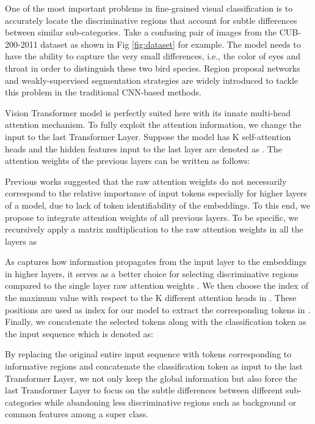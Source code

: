 \documentclass[10pt,twocolumn,letterpaper]{article}
\begin{document}
One of the most important problems in fine-grained visual classification is to accurately locate the discriminative regions that account for subtle differences between similar sub-categories. Take a confusing pair of images from the CUB-200-2011 dataset as shown in Fig \ref{fig:dataset} for example. The model needs to have the ability to capture the very small differences, i.e., the color of eyes and throat in order to distinguish these two bird species. Region proposal networks and weakly-supervised segmentation strategies are widely introduced to tackle this problem in the traditional CNN-based methods.

Vision Transformer model is perfectly suited here with its innate multi-head attention mechanism. To fully exploit the attention information, we change the input to the last Transformer Layer. Suppose the model has K self-attention heads and the hidden features input to the last layer are denoted as . The attention weights of the previous layers can be written as follows:

Previous works \cite{serrano2019attention, abnar2020quantifying} suggested that the raw attention weights do not necessarily correspond to the relative importance of input tokens especially for higher layers of a model, due to lack of token identifiability of the embeddings. To this end, we propose to integrate attention weights of all previous layers. To be specific, we recursively apply a matrix multiplication to the raw attention weights in all the layers as

As  captures how information propagates from the input layer to the embeddings in higher layers, it serves as a better choice for selecting discriminative regions compared to the single layer raw attention weights . We then choose the index of the maximum value  with respect to the K different attention heads in . These positions are used as index for our model to extract the corresponding tokens in . Finally, we concatenate the selected tokens along with the classification token as the input sequence which is denoted as:

By replacing the original entire input sequence with tokens corresponding to informative regions and concatenate the classification token as input to the last Transformer Layer, we not only keep the global information but also force the last Transformer Layer to focus on the subtle differences between different sub-categories while abandoning less discriminative regions such as background or common features among a super class.
\end{document}
